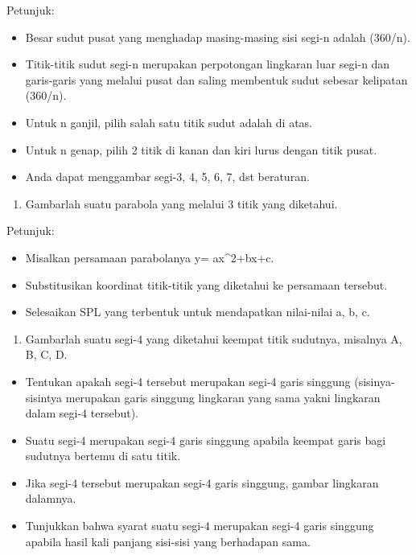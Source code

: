 \documentclass[
]{book}
\providecommand{\tightlist}{%
  \setlength{\itemsep}{0pt}\setlength{\parskip}{0pt}}
\begin{document}
Petunjuk:

\begin{itemize}
\tightlist
\item
  Besar sudut pusat yang menghadap masing-masing sisi segi-n adalah (360/n).
\item
  Titik-titik sudut segi-n merupakan perpotongan lingkaran luar segi-n dan garis-garis yang melalui pusat dan saling membentuk sudut sebesar kelipatan (360/n).
\item
  Untuk n ganjil, pilih salah satu titik sudut adalah di atas.
\item
  Untuk n genap, pilih 2 titik di kanan dan kiri lurus dengan titik pusat.
\item
  Anda dapat menggambar segi-3, 4, 5, 6, 7, dst beraturan.
\end{itemize}

\begin{enumerate}
\def\labelenumi{\arabic{enumi}.}
\setcounter{enumi}{1}
\tightlist
\item
  Gambarlah suatu parabola yang melalui 3 titik yang diketahui.
\end{enumerate}

Petunjuk:

\begin{itemize}
\tightlist
\item
  Misalkan persamaan parabolanya y= ax\^{}2+bx+c.
\item
  Substitusikan koordinat titik-titik yang diketahui ke persamaan tersebut.
\item
  Selesaikan SPL yang terbentuk untuk mendapatkan nilai-nilai a, b, c.
\end{itemize}

\begin{enumerate}
\def\labelenumi{\arabic{enumi}.}
\setcounter{enumi}{2}
\tightlist
\item
  Gambarlah suatu segi-4 yang diketahui keempat titik sudutnya, misalnya A, B, C, D.
\end{enumerate}

\begin{itemize}
\tightlist
\item
  Tentukan apakah segi-4 tersebut merupakan segi-4 garis singgung (sisinya-sisintya merupakan garis singgung lingkaran yang sama yakni lingkaran dalam segi-4 tersebut).
\item
  Suatu segi-4 merupakan segi-4 garis singgung apabila keempat garis bagi sudutnya bertemu di satu titik.
\item
  Jika segi-4 tersebut merupakan segi-4 garis singgung, gambar lingkaran dalamnya.
\item
  Tunjukkan bahwa syarat suatu segi-4 merupakan segi-4 garis singgung apabila hasil kali panjang sisi-sisi yang berhadapan sama.
\end{itemize}
\end{document}
